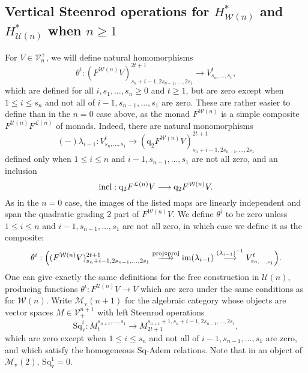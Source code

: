 \documentclass[11pt]{amsart} \renewcommand{\baselinestretch}{1.2}
\theoremstyle{plain}
\theoremstyle{definition}
\DeclareMathOperator{\im}{im}
\newcommand{\DASH}{\mathrm{-}}
\renewcommand{\to}{\longrightarrow}
\newcommand{\calU}{\mathcal{U}}
\newcommand{\calL}{\mathcal{L}}
\newcommand{\calV}{\mathcal{V}}
\newcommand{\calw}{\mathcal{W}}
\newcommand{\calu}{\mathcal{U}}
\newcommand{\call}{\mathcal{L}}
\newcommand{\calMv}{\mathcal{M}\dver}
\newcommand{\vect}[2]{\calV^{#1}_{#2}}
\newcommand{\quadgrad}[1]{\mathrm{q}_{#1}}
\newcommand{\Sq}{\mathrm{Sq}}
\newcommand{\dver}{_\mathrm{v}}
\newcommand{\Sqv}{\mathrm{Sq}\dver}
\begin{document}
\begin{Cohomology Operations for W and U}
\subsection{Vertical Steenrod operations for $H^*_{\calw(n)}$ and $H^*_{\calU(n)}$ when $n\geq1$}
\label{section: vertical Koszul operations n positive}
For $V\in \vect{+}{n}$, we will define natural homomorphisms
\[\theta^i:(F^{\calw(n)}V)^{2t+1}_{s_n+i-1,2s_{n-1},\ldots,2s_1}\to V^{t}_{s_n,\ldots,s_1},\]
which are defined for all $i,s_1,\ldots,s_n\geq0$ and $t\geq1$, but are zero except when $1\leq i \leq s_n$ and not all of $i-1,s_{n-1},\ldots,s_1$ are zero.
These are rather easier to define than in the $n=0$ case above, as the monad $F^{\calw(n)}$ is a simple composite $F^{\calu(n)}F^{\call(n)}$ of monads.
Indeed, there are natural monomorphisms
\[(\DASH)\lambda_{i-1}:V^{t}_{s_n,\ldots,s_1}\to (\quadgrad{2}F^{\calw(n)}V)^{2t+1}_{s_n+i-1,2s_{n-1},\ldots,2s_1}\]
defined only when   $1\leq i\leq n$ and $i-1,s_{n-1},\ldots,s_1$ are not all zero, and an inclusion
\[\textup{incl}:\quadgrad{2}F^{\calL(n)}V\to \quadgrad{2}F^{\calw(n)}V.\]
As in the $n=0$ case, the images of the listed maps are linearly independent and span the quadratic grading 2 part of $F^{\calw(n)}V$. We define $\theta^i$ to be zero unless $1\leq i\leq n$ and $i-1,s_{n-1},\ldots,s_1$ are not all zero, in which case we define it as the composite: %
\[\theta^i:\Bigl((F^{\calw(n)}V)^{2t+1}_{s_n+i-1,2s_{n-1},\ldots,2s_1}\overset{\textup{proj}\circ\textup{proj}}{\makebox[.06ex][l]{$\to$}\to} \im (\lambda_{i-1})\overset{(\lambda_{i-1})^{-1}}{\to}V^{t}_{s_{n,\ldots,s_1}}\Bigr).\]
One can give exactly the same definitions for the free construction in $\calU(n)$, producing functions $\theta^i:F^{\calU(n)}V\to V$ which are zero under the same conditions as for $\calw(n)$.
Write $\calMv(n+1)$ for the algebraic category whose objects are vector spaces $M\in\vect{n+1}{+}$ with left Steenrod operations
\[\Sqv^i:M^{s_{n+1},\ldots,s_1}_t\to M^{s_{n+1}+1,s_n+i-1,2s_{n-1},\ldots,2s_1}_{2t+1},\]
which are zero except when $1\leq i \leq s_n$ and not all of $i-1,s_{n-1},\ldots,s_1$ are zero, and which
satisfy the homogeneous $\Sq$-Adem relations. Note that in an object of $\calMv(2)$, $\Sqv^1=0$.


\end{Cohomology Operations for W and U}
\end{document}
